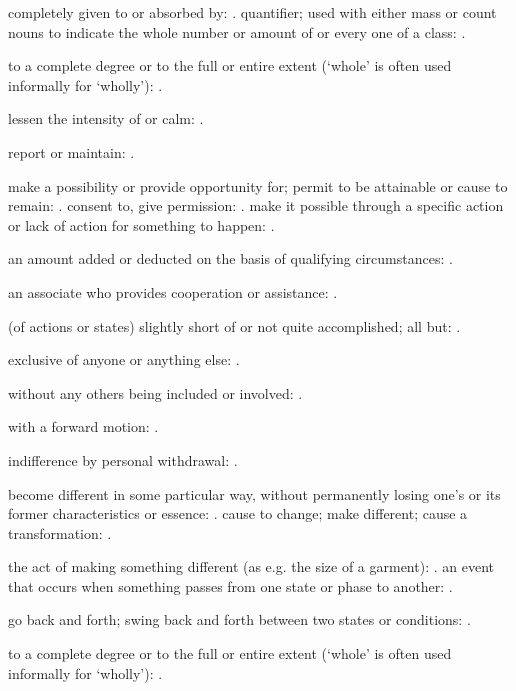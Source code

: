   completely given to or absorbed by: . quantifier; used with either mass or count nouns to indicate the whole number or amount of or every one of a class: .

  to a complete degree or to the full or entire extent (`whole' is often used informally for `wholly'): .

  lessen the intensity of or calm: .

  report or maintain: .

  make a possibility or provide opportunity for; permit to be attainable or cause to remain: . consent to, give permission: . make it possible through a specific action or lack of action for something to happen: .

  an amount added or deducted on the basis of qualifying circumstances: .

  an associate who provides cooperation or assistance: .

  (of actions or states) slightly short of or not quite accomplished; all but: .

  exclusive of anyone or anything else: .

  without any others being included or involved: .

  with a forward motion: .

  indifference by personal withdrawal: .

  become different in some particular way, without permanently losing one's or its former characteristics or essence: . cause to change; make different; cause a transformation: .

  the act of making something different (as e.g. the size of a garment): . an event that occurs when something passes from one state or phase to another: .

  go back and forth; swing back and forth between two states or conditions: .

  to a complete degree or to the full or entire extent (`whole' is often used informally for `wholly'): .

